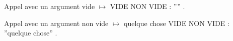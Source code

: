 \documentclass[a4paper]{article}
\newcommand{\testVide}[1]{
			\ifx\relax#1\relax
				VIDE
			\else
				NON VIDE : ''#1''
			\fi%
		}
\begin{document}
Appel avec un argument vide $\mapsto$ \testVide{}.

Appel avec un argument non vide $\mapsto$ \testVide{quelque chose}.
\end{document}
